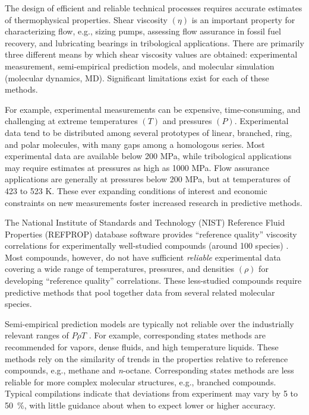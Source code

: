 \documentclass[preprint,review,12pt]{elsarticle}
\begin{document}
	The design of efficient and reliable technical processes requires accurate estimates of thermophysical properties. Shear viscosity $(\eta)$ is an important property for characterizing flow, e.g., sizing pumps, assessing flow assurance in fossil fuel recovery, and lubricating bearings in tribological applications. There are primarily three different means by which shear viscosity values are obtained: experimental measurement, semi-empirical prediction models, and molecular simulation (molecular dynamics, MD). Significant limitations exist for each of these methods. 
	
	For example, experimental measurements can be expensive, time-consuming, and challenging at extreme temperatures $(T)$ and pressures $(P)$. Experimental data tend to be distributed among several prototypes of linear, branched, ring, and polar molecules, with many gaps among a homologous series. Most experimental data are available below 200 MPa, while tribological applications may require estimates at pressures as high as 1000 MPa. Flow assurance applications are generally at pressures below 200 MPa, but at temperatures of 423 to 523 K. These ever expanding conditions of interest and economic constraints on new measurements foster increased research in predictive methods.
	
	
    
    The National Institute of Standards and Technology (NIST) Reference Fluid Properties (REFPROP) database software provides ``reference quality'' viscosity correlations for experimentally well-studied compounds (around 100 species) \cite{LEMMON-RP91}. Most compounds, however, do not have sufficient \textit{reliable} experimental data covering a wide range of temperatures, pressures, and densities $(\rho)$ for developing ``reference quality'' correlations. These less-studied compounds require predictive methods that pool together data from several related molecular species. 
    
    Semi-empirical prediction models are typically not reliable over the industrially relevant ranges of $P \rho T$ \cite{PGL}. For example, corresponding states methods are recommended for vapors, dense fluids, and high temperature liquids. These methods rely on the similarity of trends in the properties relative to reference compounds, e.g., methane and \textit{n}-octane. Corresponding states methods are less reliable for more complex molecular structures, e.g., branched compounds. Typical compilations indicate that deviations from experiment may vary by 5 to 50~\%, with little guidance about when to expect lower or higher accuracy. 
    
\end{document}
